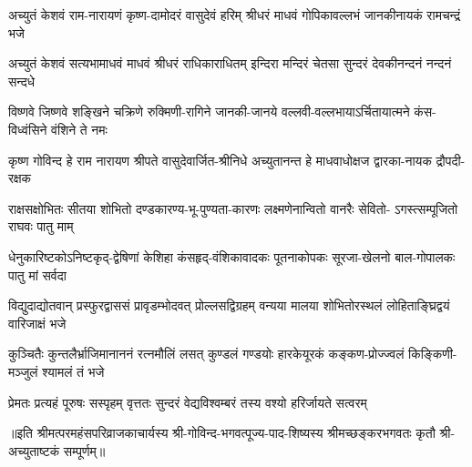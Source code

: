 

\fourlineindentedshloka
{अच्युतं केशवं राम-नारायणं}
{कृष्ण-दामोदरं वासुदेवं हरिम्}
{श्रीधरं माधवं गोपिकावल्लभं}
{जानकीनायकं रामचन्द्रं भजे}

\fourlineindentedshloka
{अच्युतं केशवं सत्यभामाधवं}
{माधवं श्रीधरं राधिकाराधितम्}
{इन्दिरा मन्दिरं चेतसा सुन्दरं}
{देवकीनन्दनं नन्दनं सन्दधे}

\fourlineindentedshloka
{विष्णवे जिष्णवे शङ्खिने चक्रिणे}
{रुक्मिणी-रागिने जानकी-जानये}
{वल्लवी-वल्लभायाऽर्चितायात्मने}
{कंस-विध्वंसिने वंशिने ते नमः}

\fourlineindentedshloka
{कृष्ण गोविन्द हे राम नारायण}
{श्रीपते वासुदेवार्जित-श्रीनिधे}
{अच्युतानन्त हे माधवाधोक्षज}
{द्वारका-नायक द्रौपदी-रक्षक}

\fourlineindentedshloka
{राक्षसक्षोभितः सीतया शोभितो}
{दण्डकारण्य-भू-पुण्यता-कारणः}
{लक्ष्मणेनान्वितो वानरैः सेवितो-}
{ऽगस्त्सम्पूजितो राघवः पातु माम्}

\fourlineindentedshloka
{धेनुकारिष्टकोऽनिष्टकृद्-द्वेषिणां}
{केशिहा कंसहृद्-वंशिकावादकः}
{पूतनाकोपकः सूरजा-खेलनो}
{बाल-गोपालकः पातु मां सर्वदा}

\fourlineindentedshloka
{विद्युदाद्योतवान् प्रस्फुरद्वाससं}
{प्रावृडम्भोदवत् प्रोल्लसद्विग्रहम्}
{वन्यया मालया शोभितोरस्थलं}
{लोहिताङ्घ्रिद्वयं वारिजाक्षं भजे}

\fourlineindentedshloka
{कुञ्चितैः कुन्तलैर्भ्राजिमानाननं}
{रत्नमौलिं लसत् कुण्डलं गण्डयोः}
{हारकेयूरकं कङ्कण-प्रोज्ज्वलं}
{किङ्किणी-मञ्जुलं श्यामलं तं भजे}

{प्रेमतः प्रत्यहं पूरुषः सस्पृहम्}
{वृत्ततः सुन्दरं वेद्यविश्वम्बरं}
{तस्य वश्यो हरिर्जायते सत्वरम्}

॥इति श्रीमत्परमहंसपरिव्राजकाचार्यस्य श्री-गोविन्द-भगवत्पूज्य-पाद-शिष्यस्य
श्रीमच्छङ्करभगवतः कृतौ श्री-अच्युताष्टकं सम्पूर्णम्॥